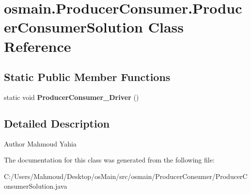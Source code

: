 \hypertarget{classosmain_1_1_producer_consumer_1_1_producer_consumer_solution}{}\section{osmain.\+Producer\+Consumer.\+Producer\+Consumer\+Solution Class Reference}
\label{classosmain_1_1_producer_consumer_1_1_producer_consumer_solution}
\subsection*{Static Public Member Functions}
\begin{DoxyCompactItemize}
\item 
static void {\bfseries Producer\+Consumer\+\_\+\+Driver} ()\hypertarget{classosmain_1_1_producer_consumer_1_1_producer_consumer_solution_a64fa5422646e7cc60ee79cfeb80b5385}{}\label{classosmain_1_1_producer_consumer_1_1_producer_consumer_solution_a64fa5422646e7cc60ee79cfeb80b5385}

\end{DoxyCompactItemize}


\subsection{Detailed Description}
\begin{DoxyAuthor}{Author}
Mahmoud Yahia 
\end{DoxyAuthor}


The documentation for this class was generated from the following file\+:\begin{DoxyCompactItemize}
\item 
C\+:/\+Users/\+Mahmoud/\+Desktop/os\+Main/src/osmain/\+Producer\+Consumer/Producer\+Consumer\+Solution.\+java\end{DoxyCompactItemize}

